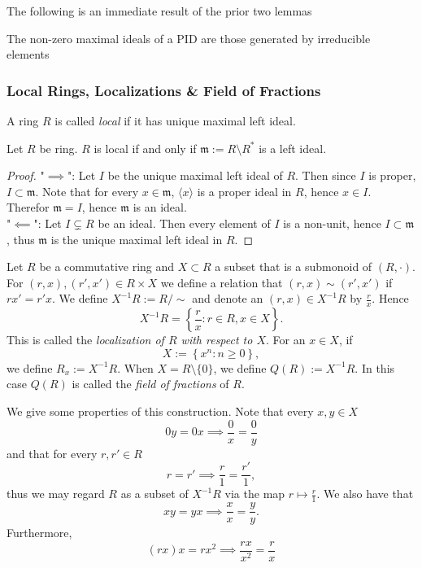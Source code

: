     The following is an immediate result of the prior two lemmas
    \begin{corollary}\label{MaximalIdealsAreThoseGeneratedByIrreducibleElements}
        The non-zero maximal ideals of a PID are those generated by irreducible elements 
    \end{corollary}
\subsubsection{Local Rings, Localizations \& Field of Fractions}
\begin{definition}
    A ring $R$ is called \textit{local} if it has unique maximal left ideal. 
\end{definition}
\begin{proposition}\label{EquivalentFormulationOfRingBeingLocal}
    Let $R$ be ring. $R$ is local if and only if $\mathfrak{m}:=R\setminus R^\ast$ is a left ideal.
\end{proposition}
\begin{proof}
    "$\implies$": Let $I$ be the unique maximal left ideal of $R$. Then since $I$ is proper, $I\subset \mathfrak{m}$. Note that for every $x\in \mathfrak{m}$, $\langle x\rangle$ is a proper ideal in $R$, hence $x\in I$. Therefor $\mathfrak{m} = I$, hence $\mathfrak{m}$ is an ideal.\\
    "$\impliedby$": Let $I\subsetneq R$ be an ideal. Then every element of $I$ is a non-unit, hence $I\subset \mathfrak{m}$, thus $\mathfrak{m}$ is the unique maximal left ideal in $R$.
\end{proof}
\begin{definition}
    Let $R$ be a commutative ring and $X\subset R$ a subset that is a submonoid of $(R,\cdot)$. For $(r,x),(r',x')\in R\times X$ we define a relation that $(r,x)\sim (r',x')$ if $rx' = r'x$. We define $X^{-1}R := R/\sim$ and denote an $(r,x)\in X^{-1}R$ by $\frac{r}{x}$. Hence 
    $$X^{-1}R = \left\{\frac{r}{x} : r \in R, x\in X \right\}.$$
    This is called the \textit{localization of $R$ with respect to $X$}. For an $x\in X$, if 
    $$X:= \left\{x^n : n\geq 0\right\},$$
    we define $R_x := X^{-1}R$. When $X = R\setminus \{0\}$, we define $Q(R) := X^{-1}R$. In this case $Q(R)$ is called the \textit{field of fractions} of $R$.
\end{definition}
\begin{remark}
    We give some properties of this construction. Note that every $x,y \in X$
    $$0y = 0x \implies \frac{0}{x} = \frac{0}{y}$$
    and that for every $r,r'\in R$
    $$r = r' \implies \frac{r}{1} = \frac{r'}{1},$$
    thus we may regard $R$ as a subset of $X^{-1}R$ via the map $r \mapsto \frac{r}{1}$. We also have that  
    $$xy = yx \implies \frac{x}{x} = \frac{y}{y}.$$
    Furthermore,
    $$(rx)x= rx^2  \implies \frac{rx}{x^2} = \frac{r}{x}$$
\end{remark}
